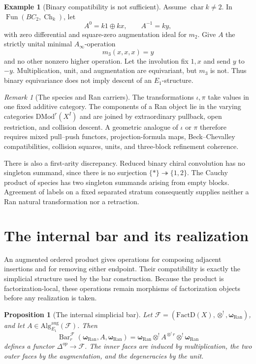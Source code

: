 \documentclass[11pt,reqno]{amsart}
\newtheorem{proposition}[theorem]{Proposition}
\theoremstyle{definition}
\newtheorem{example}[theorem]{Example}
\theoremstyle{remark}
\newtheorem{remark}[theorem]{Remark}
\providecommand{\Ran}{\mathrm{Ran}}
\providecommand{\FactD}{\mathrm{FactD}}
\providecommand{\DMod}{\mathrm{DMod}}
\providecommand{\Alg}{\mathrm{Alg}}
\newcommand{\Barc}{\operatorname{Bar}}
\begin{document}
\begin{example}[Binary compatibility is not sufficient]
\label{ex:binary-not-sufficient}
Assume \(\operatorname{char}k\ne2\).  In
\(\operatorname{Fun}(BC_2,\operatorname{Ch}_k)\), let
\[
 A^0=k1\oplus kx,\qquad A^{-1}=ky,
\]
with zero differential and square-zero augmentation ideal for \(m_2\).
Give \(A\) the strictly unital minimal \(A_\infty\)-operation
\[
 m_3(x,x,x)=y
\]
and no other nonzero higher operation.  Let the involution fix \(1,x\)
and send \(y\) to \(-y\).  Multiplication, unit, and augmentation are
equivariant, but \(m_3\) is not.  Thus binary equivariance does not
imply descent of an \(E_1\)-structure.
\end{example}

\begin{remark}[The species and Ran carriers]
\label{rem:species-ran}
The transformations \(\iota,\pi\) take values in one fixed additive
category.  The components of a Ran object lie in the varying categories
\(\DMod^r(X^I)\) and are joined by extraordinary pullback, open
restriction, and collision descent.  A geometric analogue of
\(\iota\) or \(\pi\) therefore requires mixed pull--push functors,
projection-formula maps, Beck--Chevalley compatibilities, collision
squares, units, and three-block refinement coherence.

There is also a first-arity discrepancy.  Reduced binary chiral
convolution has no singleton summand, since there is no surjection
\(\{*\}\twoheadrightarrow\{1,2\}\).  The Cauchy product of species has
two singleton summands arising from empty blocks.  Agreement of labels
on a fixed separated stratum consequently supplies neither a Ran
natural transformation nor a retraction.
\end{remark}

\section{The internal bar and its realization}

An augmented ordered product gives operations for composing adjacent
insertions and for removing either endpoint.  Their compatibility is
exactly the simplicial structure used by the bar construction.  Because
the product is factorization-local, these operations remain morphisms
of factorization objects before any realization is taken.

\begin{proposition}[The internal simplicial bar]
\label{prop:internal-bar}
Let
\(\mathcal F=(\FactD(X),\otimes^!,\boldsymbol\omega_{\Ran})\), and let
\(A\in\Alg^{\mathrm{aug}}_{E_1}(\mathcal F)\).  Then
\[
 \Barc^{\mathcal F}_r(\boldsymbol\omega_{\Ran},A,
 \boldsymbol\omega_{\Ran})
 =
 \boldsymbol\omega_{\Ran}\otimes^!
 A^{\otimes^!r}\otimes^!\boldsymbol\omega_{\Ran}
\]
defines a functor \(\Delta^{op}\to\mathcal F\).  The inner faces are
induced by multiplication, the two outer faces by the augmentation, and
the degeneracies by the unit.
\end{proposition}
\end{document}
